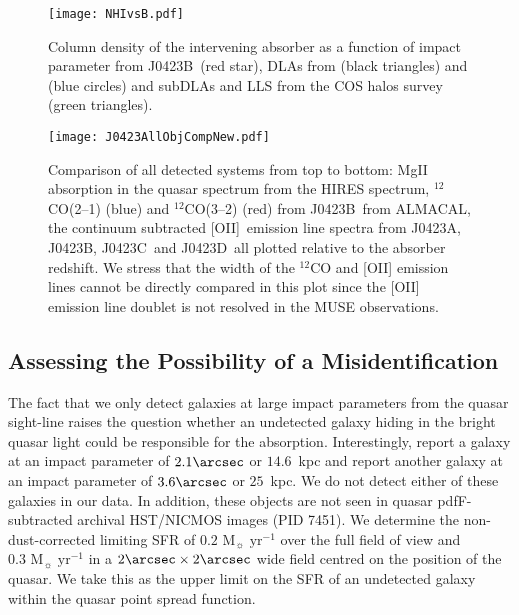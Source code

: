 \documentclass[a4paper,fleqn,usenatbib]{mnras}
\newcommand{\GalA}{J0423A}
\newcommand{\GalB}{J0423B}
\newcommand{\GalC}{J0423C}
\newcommand{\GalD}{J0423D}
\begin{document}
\begin{figure}
\texttt{[image: NHIvsB.pdf]}
\caption{Column density of the intervening absorber as a function of impact parameter from \GalB\ (red star), DLAs from \mbox{\citet{Zwaan2005reconciling}} (black triangles) and \mbox{\citet{Peroux2011sinfoni}} (blue circles) and subDLAs and LLS from the COS halos survey \mbox{\citep{Prochaska2017cos}} (green triangles).}
\label{FigColumnImpactComp}
\end{figure}

\begin{figure}
\texttt{[image: J0423AllObjCompNew.pdf]}
\caption{Comparison of all detected systems from top to bottom: MgII absorption in the quasar spectrum from the HIRES spectrum, $^{12}$CO(2--1) (blue) and $^{12}$CO(3--2) (red) from \GalB\ from ALMACAL, the continuum subtracted [OII]~emission line spectra from \GalA, \GalB, \GalC\ and \GalD\ all plotted relative to the absorber redshift. We stress that the width of the $^{12}$CO and [OII] emission lines cannot be directly compared in this plot since the [OII] emission line doublet is not resolved in the MUSE observations.}
\label{FigAllComp}
\end{figure}

\subsection{Assessing the Possibility of a Misidentification}


The fact that we only detect galaxies at large impact parameters from the quasar sight-line raises the question whether an undetected galaxy hiding in the bright quasar light could be responsible for the absorption. Interestingly, \mbox{\citet{Churchill1996spatial}} report a galaxy at an impact parameter of $2.1\arcsec$ or $14.6$~kpc and \mbox{\citet{Rao2011groundbased}} report another galaxy at an impact parameter of $3.6\arcsec$ or $25$~kpc. We do not detect either of these galaxies in our data. In addition, these objects are not seen in quasar pdfF-subtracted archival HST/NICMOS images (PID 7451).
We determine the non-dust-corrected limiting SFR of $0.2\text{ M}_{\sun} \text{ yr}^{-1}$ over the full field of view and $0.3 \text{ M}_{\sun} \text{ yr}^{-1}$ in a $2\arcsec \times 2 \arcsec $ wide field centred on the position of the quasar. We take this as the upper limit on the SFR of an undetected galaxy within the quasar point spread function.\\
\end{document}
